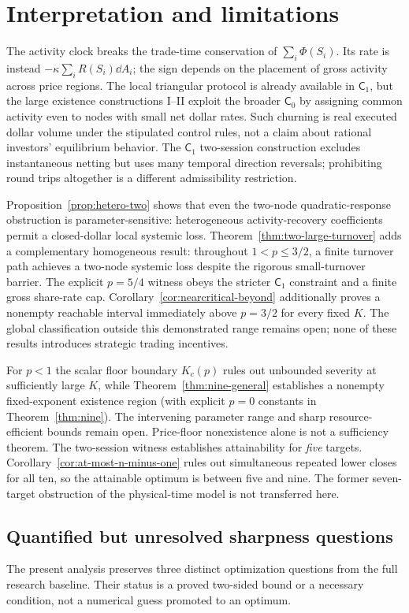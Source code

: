 \documentclass[review,hidelinks,onefignum,onetabnum]{siamonline250211}%
\begin{document}
\section{Interpretation and limitations}\label{sec:discussion}
The activity clock breaks the trade-time conservation of
$\sum_i\Phi(S_i)$. Its rate is instead
$-\kappa\sum_iR(S_i)\dd A_i$; the sign depends on the placement
of gross activity across price regions. The local triangular protocol
is already available in $\mathsf C_1$, but the large existence
constructions I--II exploit the broader $\mathsf C_0$ by assigning
common activity even to nodes with small net dollar rates. Such
churning is real executed dollar volume under the stipulated control
rules, not a claim about rational investors' equilibrium behavior.
The $\mathsf C_1$ two-session construction excludes instantaneous
netting but uses many temporal direction reversals; prohibiting
round trips altogether is a different admissibility restriction.

Proposition~\ref{prop:hetero-two} shows that even the
two-node quadratic-response obstruction is parameter-sensitive:
heterogeneous activity-recovery coefficients permit a
closed-dollar local systemic loss. Theorem~\ref{thm:two-large-turnover}
adds a complementary homogeneous result: throughout
$1<p\le3/2$, a finite turnover path achieves a two-node
systemic loss despite the rigorous small-turnover barrier.
The explicit $p=5/4$ witness obeys the stricter
$\mathsf C_1$ constraint and a finite gross share-rate cap.
Corollary~\ref{cor:nearcritical-beyond} additionally
proves a nonempty reachable interval immediately above
$p=3/2$ for every fixed $K$. The global classification
outside this demonstrated range remains open; none of
these results introduces strategic trading incentives.

For $p<1$ the scalar floor boundary $K_c(p)$ rules out
unbounded severity at sufficiently large $K$, while
Theorem~\ref{thm:nine-general} establishes a nonempty
fixed-exponent existence region (with explicit $p=0$ constants
in Theorem~\ref{thm:nine}).
The intervening parameter range and sharp resource-efficient bounds
remain open. Price-floor nonexistence alone is not a sufficiency
theorem. The two-session witness establishes attainability for
\emph{five} targets. Corollary~\ref{cor:at-most-n-minus-one}
rules out simultaneous repeated lower closes for all ten,
so the attainable optimum is between five and nine. The
former seven-target obstruction of the physical-time model
is not transferred here.

\subsection{Quantified but unresolved sharpness questions}
\label{sec:open-sharpness}
The present analysis preserves three distinct optimization
questions from the full research baseline. Their status is a
proved two-sided bound or a necessary condition, not a
numerical guess promoted to an optimum.
\end{document}
